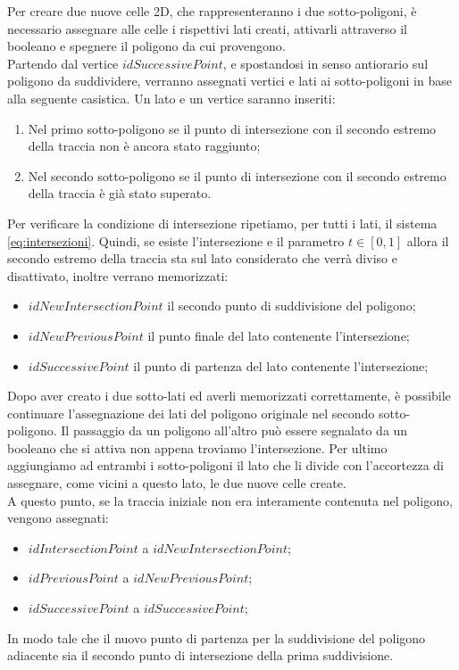 \documentclass[a4paper]{article}
\begin{document}
Per creare due nuove celle 2D, che rappresenteranno i due sotto-poligoni, è necessario assegnare alle celle i rispettivi lati creati, attivarli attraverso il booleano e spegnere il poligono da cui provengono. \\

Partendo dal vertice $idSuccessivePoint$, e spostandosi in senso antiorario sul poligono da suddividere, verranno assegnati vertici e lati ai sotto-poligoni in base alla seguente casistica.
Un lato e un vertice saranno inseriti: 
\begin{enumerate} 
\item Nel primo sotto-poligono se il punto di intersezione con il secondo estremo della traccia non è ancora stato raggiunto;
\item Nel secondo sotto-poligono se il punto di intersezione con il secondo estremo della traccia è già stato superato.
\end{enumerate}
Per verificare la condizione di intersezione ripetiamo, per tutti i lati, il sistema \eqref{eq:intersezioni}. Quindi, se esiste l'intersezione e il parametro $t \in [0,1]$ allora il secondo estremo della traccia sta sul lato considerato che verrà diviso e disattivato, inoltre verrano memorizzati: 
\begin{itemize} 
\item $idNewIntersectionPoint$ il secondo punto di suddivisione del poligono;
\item $idNewPreviousPoint$ il punto finale del lato contenente l'intersezione;
\item $idSuccessivePoint$ il punto di partenza del lato contenente l'intersezione;
\end{itemize}
Dopo aver creato i due sotto-lati ed averli memorizzati correttamente, è possibile continuare l'assegnazione dei lati del poligono originale nel secondo sotto-poligono. Il passaggio da un poligono all'altro può essere segnalato da un booleano che si attiva non appena troviamo l'intersezione. Per ultimo aggiungiamo ad entrambi i sotto-poligoni il lato che li divide con l'accortezza di assegnare, come vicini a questo lato, le due nuove celle create.
\\ [2mm]
A questo punto, se la traccia iniziale non era interamente contenuta nel poligono, vengono assegnati:
\begin{itemize} 
\item $idIntersectionPoint$ a $idNewIntersectionPoint$;
\item $idPreviousPoint$ a $idNewPreviousPoint$;
\item $idSuccessivePoint$ a $idSuccessivePoint$;
\end{itemize}
In modo tale che il nuovo punto di partenza per la suddivisione del poligono adiacente sia il secondo punto di intersezione della prima suddivisione. \\
\end{document}
